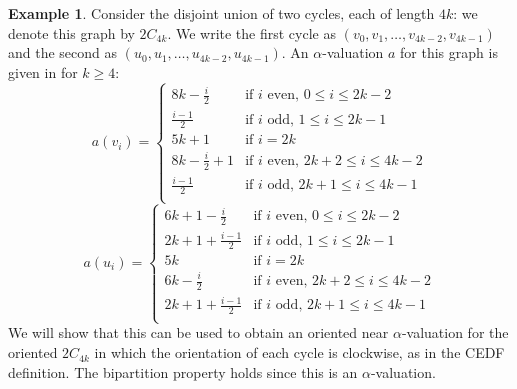 \documentclass[12pt, a4paper]{article}
\theoremstyle{definition}
\newtheorem{example}[theorem]{Example}
\begin{document}
\begin{example}\label{ex:2C4k}
Consider the disjoint union of two cycles, each of length $4k$: we denote this graph by $2C_{4k}$. We write the first cycle as $(v_0,v_1,\ldots,v_{4k-2},v_{4k-1})$ and the second as $(u_0,u_1,\ldots,u_{4k-2},u_{4k-1})$. An $\alpha$-valuation $a$ for this graph is given in \cite{Abr} for $k \geq 4$:
    \[a(v_i)=
    \begin{cases}
        8k-\frac{i}{2} & \text{if } i \text{ even, } 0 \leq i \leq 2k-{2}\\
        \frac{i-1}{2} & \text{if } i \text{ odd, } 1 \leq i \leq 2k-1\\
        5k+1 & \text{if } i = 2k\\
        8k-\frac{i}{2}+1 & \text{if } i \text{ even, } 2k+{2} \leq i \leq 4k-{2}\\
        \frac{i-1}{2} & \text{if } i \text{ odd, } 2k+1 \leq i \leq 4k-1\\
    \end{cases}\]
    \[a(u_i)=
    \begin{cases}
        6k+1-\frac{i}{2} & \text{if } i \text{ even, } 0 \leq i \leq 2k-2\\
        2k+1+\frac{i-1}{2} & \text{if } i \text{ odd, } 1 \leq i \leq 2k-1\\
        5k & \text{if } i = 2k\\
        6k-\frac{i}{2} & \text{if } i \text{ even, } 2k+2 \leq i \leq 4k-2\\
        2k+1+\frac{i-1}{2} & \text{if } i \text{ odd, } 2k+1 \leq i \leq 4k-1\\
    \end{cases}\]
    We will show that this can be used to obtain an oriented near $\alpha$-valuation for the oriented $2C_{4k}$ in which the orientation of each cycle is  clockwise, as in the CEDF definition. The bipartition property holds since this is an $\alpha$-valuation.


\end{example}
\end{document}
